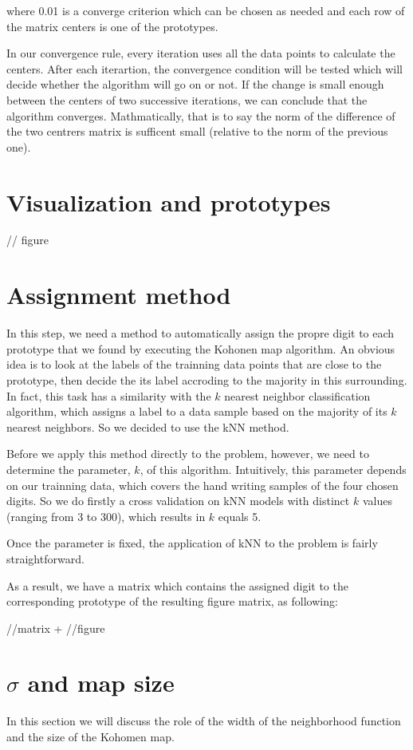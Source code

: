 \documentclass[a4paper, 12pt]{article}
\begin{document}
where 0.01 is a converge criterion which can be chosen as needed and each row of the matrix centers is one of the prototypes.

In our convergence rule, every iteration uses all the data points to
calculate the centers. After each iterartion, the convergence
condition will be tested which will decide whether the algorithm will
go on or not. If the change is small enough between the centers of two
successive iterations, we can conclude that the algorithm
converges. Mathmatically, that is to say the norm of the difference of the two centrers matrix is sufficent small (relative to the norm of the previous one).

\section{Visualization and prototypes}
// figure

\section{Assignment method}
In this step, we need a method to automatically assign the propre
digit to each prototype that we found by executing the Kohonen map
algorithm. An obvious idea is to look at the labels of the trainning
data points that are close to the prototype, then decide the its label
accroding to the majority in this surrounding. In fact, this task has
a similarity with the $k$ nearest neighbor classification algorithm,
which assigns a label to a data sample based on the majority of its $k$
nearest neighbors. So we decided to use the kNN method.

Before we apply this method directly to the problem, however, we need
to determine the parameter, $k$, of this algorithm. Intuitively, this
parameter depends on our trainning data, which covers the hand
writing samples of the four chosen digits. So we do firstly a cross
validation on kNN models with distinct $k$ values (ranging from 3 to 300),
which results in $k$ equals 5.

Once the parameter is fixed, the application of kNN to the problem is fairly straightforward.

As a result, we have a matrix which contains the assigned digit to the corresponding prototype of the resulting figure matrix, as following:

//matrix + //figure

\section{$\sigma$ and map size}
In this section we will discuss the role of the width of the neighborhood function and the size of the Kohomen map.
\end{document}
